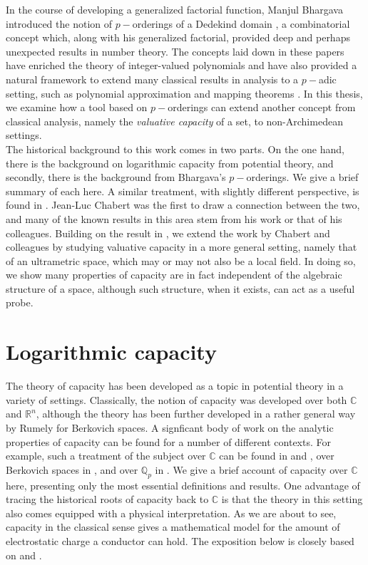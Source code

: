 
In the course of developing a generalized factorial function, Manjul Bhargava introduced the notion of  $p-$orderings of a Dedekind domain \cite{mb1, mb2}, a combinatorial concept which, along with his generalized factorial, provided deep and perhaps unexpected results in number theory. The concepts laid down in these papers have enriched the theory of integer-valued polynomials \cite{mb3, kj2} and have also provided a natural framework to extend many classical results in analysis to a $p-$adic setting, such as polynomial approximation and mapping theorems \cite{mb1, mb2,mb3}. In this thesis, we examine how a tool based on $p-$orderings can extend another concept from classical analysis, namely the \textit{valuative capacity} of a set, to non-Archimedean settings.\\

The historical background to this work comes in two parts. On the one hand, there is the background on logarithmic capacity from potential theory, and secondly, there is the background from Bhargava's $p-$orderings. We give a brief summary of each here. A similar treatment, with slightly different perspective, is found in \cite{fp}. Jean-Luc Chabert was the first to draw a connection between the two, and many of the known results in this area stem from his work or that of his colleagues. Building on the result in \cite{kj}, we extend the work by Chabert and colleagues by studying valuative capacity in a more general setting, namely that of an ultrametric space, which may or may not also be a local field. In doing so, we show many properties of capacity are in fact independent of the algebraic structure of a space, although such structure, when it exists, can act as a useful probe.\\

\section{Logarithmic capacity}
The theory of capacity has been developed as a topic in potential theory in a variety of settings. Classically, the notion of capacity was developed over both $\mathbb{C}$ and $\mathbb{R}^n$, although the theory has been further developed in a rather general way by Rumely for Berkovich spaces. A  signficant body of work on the analytic properties of capacity can be found for a number of different contexts. For example, such a treatment of the subject over $\mathbb{C}$ can be found in \cite{wer} and \cite{rand}, over Berkovich spaces in \cite{rum}, and over $\mathbb{Q}_p$ in \cite{dgc}. We give a brief account of capacity over $\mathbb{C}$ here, presenting only the most essential definitions and results.   One advantage of tracing the historical roots of capacity back to $\mathbb{C}$ is that the theory in this setting also comes equipped with a physical interpretation. As we are about to see, capacity in the classical sense gives a mathematical model for the amount of electrostatic charge a conductor can hold. The exposition below is closely based on \cite{rand} and \cite{rand2}.\\

